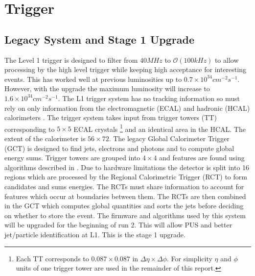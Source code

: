 
\chapter{Trigger} %

\label{Chapter4} %



\section{Legacy System and Stage 1 Upgrade}
The Level 1 trigger is designed to filter from $40MHz$ to $\mathcal{O}(100kHz)$ to allow processing by the high level trigger while keeping high acceptance for interesting events. This has worked well at previous luminosities up to $0.7\times10^{34} cm^{-2}s^{-1}$. However, with the upgrade the maximum luminosity will increase to $1.6\times10^{34} cm^{-2}s^{-1}$. The L1 trigger system has no tracking information so must rely on only information from the electromagnetic (ECAL) and hadronic (HCAL) calorimeters \cite{gct}. The trigger system takes input from  trigger towers (TT) corresponding to $5\times5$ ECAL crystals \footnote{Each TT corresponds to $0.087\times0.087$ in $\Delta\eta\times\Delta\phi$. For simplicity $\eta$ and $\phi$ units of one trigger tower are used in the remainder of this report.} and an identical area in the HCAL. The extent of the calorimeter is $56\times72$. The legacy Global Calorimeter Trigger (GCT) is designed to find jets, electrons and photons and to compute global energy sums. Trigger towers are grouped into $4\times4$ and features are found using algorithms described in \cite{gctalgo}. Due to hardware limitations the detector is split into 16 regions which are processed by the Regional Calorimetric Trigger (RCT) to form candidates and sums energies. The RCTs must share information to account for features which occur at boundaries between them. The RCTs are then combined in the GCT which computes global quantities and sorts the jets before deciding on whether to store the event. The firmware and algorithms used by this system will be upgraded for the beginning of run 2. This will allow PUS and better jet/particle identification at L1. This is the stage 1 upgrade. 

